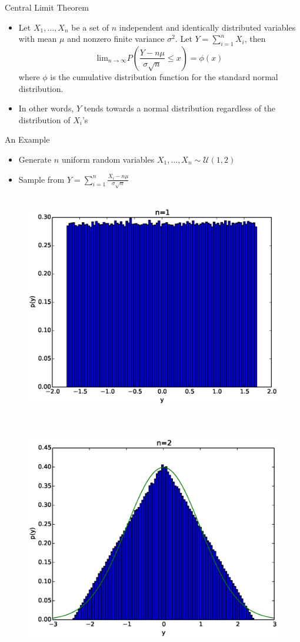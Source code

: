 \documentclass{beamer}
\begin{document}
\begin{frame}{Central Limit Theorem} 
\begin{itemize} 
 \item Let $X_1, \ldots, X_n$ be a set of $n$ independent and identically distributed variables with mean $\mu$ and nonzero finite variance $\sigma^2$. Let $Y = \sum_{i=1}^n X_i$, then 
\begin{displaymath}
 \mbox{lim}_{n \rightarrow \infty} P\left(\frac{Y - n\mu}{\sigma\sqrt{n}} \leq x\right) = \phi(x)
\end{displaymath}
where $\phi$ is the cumulative distribution function for the standard normal distribution. 
\item In other words, $Y$ tends towards a normal distribution regardless of the distribution of $X_i$'s 
\end{itemize}
\end{frame}

\begin{frame}{An Example}  
\begin{itemize} 
 \item Generate $n$ uniform random variables $X_1, \ldots, X_n \sim \mathcal{U}(1, 2)$ 
\item Sample from $Y = \sum_{i=1}^n \frac{X_i - n\mu}{\sigma \sqrt{n}}$ 
\end{itemize}
 \begin{figure}[htp]
\mbox{
\includegraphics[width=0.5\linewidth]{clt0.eps}
}
\end{figure} 
\end{frame}

\begin{frame} 
  \begin{figure}[htp]
\mbox{
\includegraphics[width=0.5\linewidth]{clt1.eps}
}
\end{figure} 
\end{frame}
\end{document}
